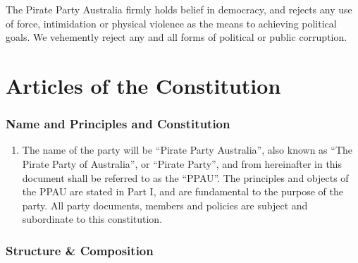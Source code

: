 \documentclass[a4paper,titlepage,8.5pt]{article}
\begin{document}
The Pirate Party Australia firmly holds belief in democracy, and rejects any use of force, intimidation or physical violence as the means to achieving political goals. We vehemently reject any and all forms of political or public corruption.
\newpage

\part{Articles of the Constitution}

\section{Name and Principles and Constitution}

\begin{enumerate}
\item The name of the party will be ``Pirate Party Australia'', also known as ``The Pirate Party of Australia'', or ``Pirate Party'', and from hereinafter in this document shall be referred to as the ``PPAU''. The principles and objects of the PPAU are stated in Part I, and are fundamental to the purpose of the party. All party documents, members and policies are subject and subordinate to this constitution.
\end{enumerate}

\section{Structure \& Composition}
\end{document}
